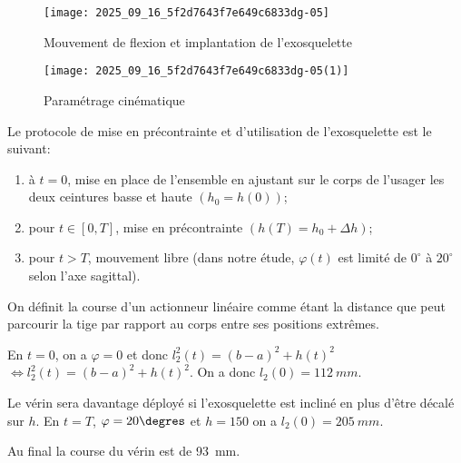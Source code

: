 \begin{figure}[!h]
\centering
\texttt{[image: 2025\_09\_16\_5f2d7643f7e649c6833dg-05]}
\caption{\label{ccs_mp_2023_fig_06}  Mouvement de flexion et implantation de l'exosquelette}
\end{figure}





\begin{figure}[!h]
\centering
\texttt{[image: 2025\_09\_16\_5f2d7643f7e649c6833dg-05(1)]}
\caption{\label{ccs_mp_2023_fig_07} Paramétrage cinématique }
\end{figure}




Le protocole de mise en précontrainte et d'utilisation de l'exosquelette est le suivant:

\begin{enumerate}
  \item à $t=0$, mise en place de l'ensemble en ajustant sur le corps de l'usager les deux ceintures basse et haute $\left(h_{0}=h(0)\right)$;
  \item pour $t \in[0, T]$, mise en précontrainte $\left(h(T)=h_{0}+\Delta h\right)$;
  \item pour $t>T$, mouvement libre (dans notre étude, $\varphi(t)$ est limité de $0^{\circ}$ à $20^{\circ}$ selon l'axe sagittal).
\end{enumerate}

On définit la course d'un actionneur linéaire comme étant la distance que peut parcourir la tige par rapport au corps entre ses positions extrêmes.\\
\fi

\ifprof
\begin{corrige}
En $t=0$, on a $\varphi = 0$ et donc 
$l_2^2(t) = \left(b -a  \right)^2  +  h(t)^2  $
$\Leftrightarrow l_2^2(t) = \left(b -a  \right)^2  +  h(t)^2  $.
On a donc $l_2(0) = \SI{112}{mm}$.

Le vérin sera davantage déployé si l'exosquelette est incliné en plus d'être décalé sur $h$.
 En $t=T$, $\varphi = 20\degres$ et $h = 150$ on a 
 $l_2(0) = \SI{205}{mm}$.
 
 Au final la course du vérin est de \SI{93}{mm}.

\end{corrige}
\else
\fi

